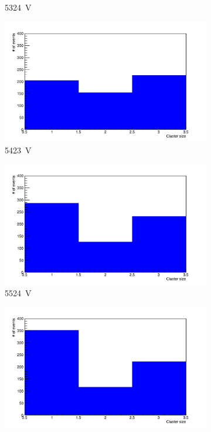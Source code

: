 \begin{figure}[H]
\begin{subfigure}{.33\linewidth}
			\caption{\label{fig:cluster-size-1D:C} \SI{5324}{V}}
		\end{subfigure}
		\begin{subfigure}{.33\linewidth}
		    \centering
			\includegraphics[width=\linewidth]{fig/chapt6/Muon-ClS-1D-5300-gRPC-INFN.pdf}
			\caption{\label{fig:cluster-size-1D:D} \SI{5423}{V}}
		\end{subfigure}
		\begin{subfigure}{.33\linewidth}
		    \centering
			\includegraphics[width=\linewidth]{fig/chapt6/Muon-ClS-1D-5400-gRPC-INFN.pdf}
			\caption{\label{fig:cluster-size-1D:E} \SI{5524}{V}}
		\end{subfigure}
		\begin{subfigure}{.33\linewidth}
		    \centering
			\includegraphics[width=\linewidth]{fig/chapt6/Muon-ClS-1D-5500-gRPC-INFN.pdf}

\end{subfigure}
\end{figure}
